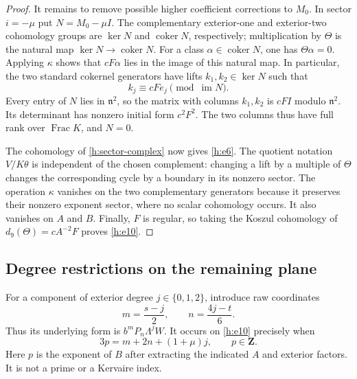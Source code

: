 \documentclass[11pt]{article}
\theoremstyle{definition}
\theoremstyle{remark}
\numberwithin{equation}{section}
\begin{document}
\begin{proof}
It remains to remove possible higher coefficient corrections to $M_0$.
In sector $i=-\mu$ put $N=M_0-\mu I$. The complementary
exterior-one and exterior-two cohomology groups are
$\ker N$ and $\operatorname{coker} N$, respectively; multiplication by $\Theta$
is the natural map $\ker N\to\operatorname{coker} N$. For a class
$\alpha\in\operatorname{coker} N$, one has $\Theta\alpha=0$. Applying
$\kappa$ shows that $cF\alpha$ lies in the image of this natural
map. In particular, the two standard cokernel generators have lifts
$k_1,k_2\in\ker N$ such that
\[
 k_j\equiv cF e_j\pmod{\operatorname{im} N}.
\]
Every entry of $N$ lies in $\mathfrak n^2$, so the matrix with columns
$k_1,k_2$ is $cF I$ modulo $\mathfrak n^2$. Its determinant has
nonzero initial form $c^2F^2$. The two columns thus have full rank
over $\operatorname{Frac}K$, and $N=0$.

The cohomology of \eqref{h:sector-complex} now gives
\eqref{h:e6}. The quotient notation $V/K\theta$ is independent of
the chosen complement: changing a lift by a multiple of $\Theta$
changes the corresponding cycle by a boundary in its nonzero sector.
The operation $\kappa$ vanishes on the two complementary generators
because it preserves their nonzero exponent sector, where no scalar
cohomology occurs. It also vanishes on $A$ and $B$. Finally, $F$ is
regular, so taking the Koszul cohomology of
$d_9(\Theta)=cA^{-2}F$ proves \eqref{h:e10}.
\end{proof}

\subsection{Degree restrictions on the remaining plane}

For a component of exterior degree $j\in\{0,1,2\}$, introduce raw
coordinates
\begin{equation}
 \label{h:raw-coordinates}
 m=\frac{s-j}{2},\qquad n=\frac{4j-t}{6}.
\end{equation}
Thus its underlying form is $b^mP_n\Lambda^jW$. It occurs on
\eqref{h:e10} precisely when
\begin{equation}
 \label{h:p-coordinate}
 3p=m+2n+(1+\mu)j,\qquad p\in\mathbf Z.
\end{equation}
Here $p$ is the exponent of $B$ after extracting the indicated $A$
and exterior factors. It is not a prime or a Kervaire index.
\end{document}
